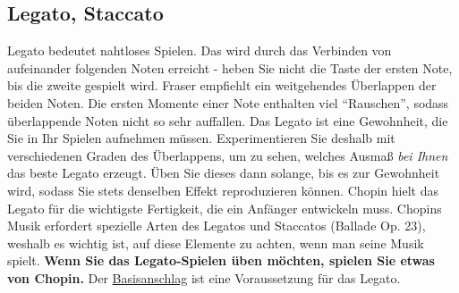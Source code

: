 \subsection{Legato, Staccato}
\label{c1iii1c}

Legato bedeutet nahtloses Spielen.
Das wird durch das Verbinden von aufeinander folgenden Noten erreicht - heben Sie nicht die Taste der ersten Note, bis die zweite gespielt wird.
Fraser empfiehlt ein weitgehendes Überlappen der beiden Noten.
Die ersten Momente einer Note enthalten viel \enquote{Rauschen}, sodass überlappende Noten nicht so sehr auffallen.
Das Legato ist eine Gewohnheit, die Sie in Ihr Spielen aufnehmen müssen.
Experimentieren Sie deshalb mit verschiedenen Graden des Überlappens, um zu sehen, welches Ausmaß \textit{bei Ihnen} das beste Legato erzeugt.
Üben Sie dieses dann solange, bis es zur Gewohnheit wird, sodass Sie stets denselben Effekt reproduzieren können.
Chopin hielt das Legato für die wichtigste Fertigkeit, die ein Anfänger entwickeln muss.
Chopins Musik erfordert spezielle Arten des Legatos und Staccatos (Ballade Op. 23), weshalb es wichtig ist, auf diese Elemente zu achten, wenn man seine Musik spielt.
\textbf{Wenn Sie das Legato-Spielen üben möchten, spielen Sie etwas von Chopin.}
Der \hyperref[c1iii1a1]{Basisanschlag} ist eine Voraussetzung für das Legato.

